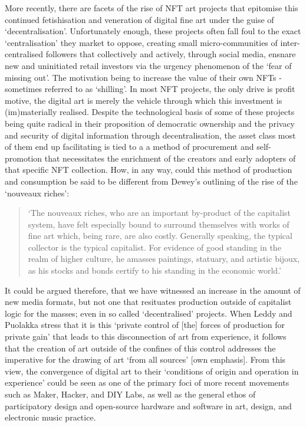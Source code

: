 More recently, there are facets of the rise of NFT art projects that epitomise this continued fetishisation and veneration of digital fine art under the guise of `decentralisation'. Unfortunately enough, these projects often fall foul to the exact `centralisation' they market to oppose, creating small micro-communities of inter-centralised followers that collectively and actively, through social media, ensnare new and uninitiated retail investors via the urgency phenomenon of the `fear of missing out'. The motivation being to increase the value of their own NFTs - sometimes referred to as `shilling'. In most NFT projects, the only drive is profit motive, the digital art is merely the vehicle through which this investment is (im)materially realised. Despite the technological basis of some of these projects being quite radical in their proposition of democratic ownership and the privacy and security of digital information through decentralisation, the asset class most of them end up facilitating is tied to a a method of procurement and self-promotion that necessitates the enrichment of the creators and early adopters of that specific NFT collection. How, in any way, could this method of production and consumption be said to be different from Dewey's outlining of the rise of the `nouveaux riches':
\begin{quote}
    `The nouveaux riches, who are an important by-product of the capitalist system, have felt especially bound to surround themselves with works of fine art which, being rare, are also costly. Generally speaking, the typical collector is the typical capitalist. For evidence of good standing in the realm of higher culture, he amasses paintings, statuary, and artistic bijoux, as his stocks and bonds certify to his standing in the economic world.' \citeyearpar[p. 7]{dewey1934}
\end{quote}
It could be argued therefore, that we have witnessed an increase in the amount of new media formats, but not one that resituates production outside of capitalist logic for the masses; even in so called `decentralised' projects. When Leddy and Puolakka stress that it is this `private control of [the] forces of production for private gain' that leads to this disconnection of art from experience, it follows that the creation of art outside of the confines of this control addresses the imperative for the drawing of art `from all sources' [own emphasis]. From this view, the convergence of digital art to their `conditions of origin and operation in experience' could be seen as one of the primary foci of more recent movements such as Maker, Hacker, and DIY Labs, as well as the general ethos of participatory design and open-source hardware and software in art, design, and electronic music practice.

